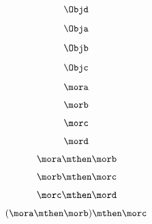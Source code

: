 {\begin{forslides}
        \begin{equation}
            \label{eq:00}
            \Objd
        \end{equation}

        \begin{equation}
            \label{eq:01}
            \Obja
        \end{equation}

        \begin{equation}
            \label{eq:02}
            \Objb
        \end{equation}

        \begin{equation}
            \label{eq:03}
            \Objc
        \end{equation}

        \begin{equation}
            \label{eq:04}
            \mora
        \end{equation}

        \begin{equation}
            \label{eq:05}
            \morb
        \end{equation}

        \begin{equation}
            \label{eq:06}
            \morc
        \end{equation}

        \begin{equation}
            \label{eq:07}
            \mord
        \end{equation}

        \begin{equation}
            \label{eq:08}
            \mora \mthen \morb
        \end{equation}

        \begin{equation}
            \label{eq:09}
            \morb \mthen \morc
        \end{equation}

        \begin{equation}
            \label{eq:10}
            \morc \mthen \mord
        \end{equation}

        \begin{equation}
            \label{eq:11}
            (\mora \mthen \morb) \mthen \morc
        \end{equation}


\end{forslides}}
